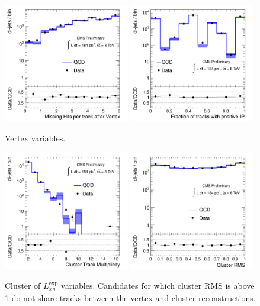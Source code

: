 \begin{figure}[htbp]
\includegraphics[width=0.49\textwidth]{plots/control/ctrl_NAvgMissHitsAfterVert.pdf}
\includegraphics[width=0.49\textwidth]{plots/control/ctrl_Posip2dFrac.pdf}

\caption{Vertex variables. \label{fig:vertex}}
\end{figure}


\begin{figure}[htbp]
\centering
\includegraphics[width=0.49\textwidth]{plots/control/ctrl_clrN.pdf}
\includegraphics[width=0.49\textwidth]{plots/control/ctrl_clrRMS.pdf}

\caption{Cluster of $L_{xy}^\text{exp}$ variables. Candidates for which cluster RMS is above 1 do not share
tracks between the vertex and cluster reconstructions. \label{fig:cluster}}
\end{figure}

